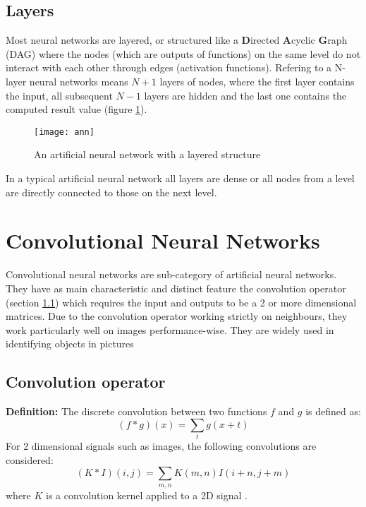 \subsection{Layers}
\label{subsec:obj_nn_layers}

\qquad Most neural networks are layered, or structured like a \textbf{D}irected \textbf{A}cyclic \textbf{G}raph (DAG) where the nodes (which are outputs of functions) on the same level do not interact with each other through edges (activation functions). Refering to a N-layer neural networks means $N+1$ layers of nodes, where the first layer contains the input, all subsequent $N-1$ layers are hidden and the last one contains the computed result value (figure \ref{fig:ann}).

\begin{figure}[b!]
\centering
\texttt{[image: ann]}
\caption{An artificial neural network with a layered structure}
\label{fig:ann}
\end{figure}

\qquad In a typical artificial neural network all layers are dense or all nodes from a level are directly connected to those on the next level.

\section{Convolutional Neural Networks}
\label{sec:obj_cnn}

\qquad Convolutional neural networks are sub-category of artificial neural networks. They have as main characteristic and distinct feature the convolution operator (section \ref{subsec:obj_cnn_conv}) which requires the input and outputs to be a 2 or more dimensional matrices. Due to the convolution operator working strictly on neighbours, they work particularly well on images performance-wise. They are widely used in identifying objects in pictures

\subsection{Convolution operator}
\label{subsec:obj_cnn_conv}

\qquad \textbf{Definition:} The discrete convolution between two functions $f$ and $g$ is defined as: 
\[ (f * g)(x) = \sum_{t}{g(x + t)} \] 
For 2 dimensional signals such as images, the following convolutions are considered: 
\[ (K * I)(i, j) = \sum_{m,n}{K(m, n)I(i + n, j + m)}\]
where $K$ is a convolution kernel applied to a 2D signal \cite{toulouse-nn}.

